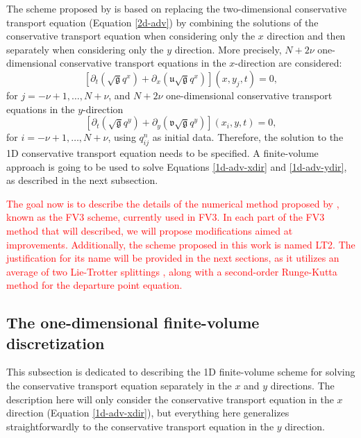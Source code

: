 \documentclass[preprint,12pt]{elsarticle}
\begin{document}
\begin{linenumbers}
The scheme proposed by \cite{lin:1996} is based on replacing the two-dimensional conservative transport equation (Equation \eqref{2d-adv}) by combining the solutions of the conservative transport equation when considering only the $x$ direction and then separately when considering only the $y$ direction.
More precisely, $N+2\nu$ one-dimensional conservative transport equations in the $x$-direction are considered:
\begin{equation}
	\label{1d-adv-xdir}
	[{\partial_t (\sqrt{\mathfrak{g}}q^x)}+{\partial_x (\mathfrak{u}\sqrt{\mathfrak{g}}q^x)}](x, y_j, t) = 0,
\end{equation}
for $j=-\nu+1, \ldots, N + \nu$, and
$N+2\nu$ one-dimensional conservative transport equations in the $y$-direction
\begin{equation}
	\label{1d-adv-ydir}
	[{\partial_t (\sqrt{\mathfrak{g}}q^y)} +{\partial_y (\mathfrak{v}\sqrt{\mathfrak{g}}q^y)}](x_i, y, t) = 0,
\end{equation}
for $i=-\nu+1, \ldots, N + \nu$, using $q_{ij}^n$ as initial data.
Therefore, the solution to the 1D conservative transport equation needs to be specified.
A finite-volume approach is going to be used to solve Equations \eqref{1d-adv-xdir} and \eqref{1d-adv-ydir}, as described in the next subsection.

\textcolor{red}
{
The goal now is to describe the details of the numerical method proposed by \citep{putman:2007}, known as the FV3 scheme, currently used in FV3.
In each part of the FV3 method that will described, we will propose modifications aimed at improvements. 
Additionally, the scheme proposed in this work is named LT2.
The justification for its name will be provided in the next sections, as it utilizes an average of two Lie-Trotter splittings \cite{holden:2010}, along with a second-order Runge-Kutta method for the departure point equation.
}

\subsection{The one-dimensional finite-volume discretization}
\label{1d-adv}
This subsection is dedicated to describing the 1D finite-volume scheme for solving the conservative transport equation separately in the $x$ and $y$ directions.
The description here will only consider the conservative transport equation in the $x$ direction (Equation \ref{1d-adv-xdir}), but everything here generalizes straightforwardly to the conservative transport equation in the $y$ direction.


\end{linenumbers}
\end{document}
